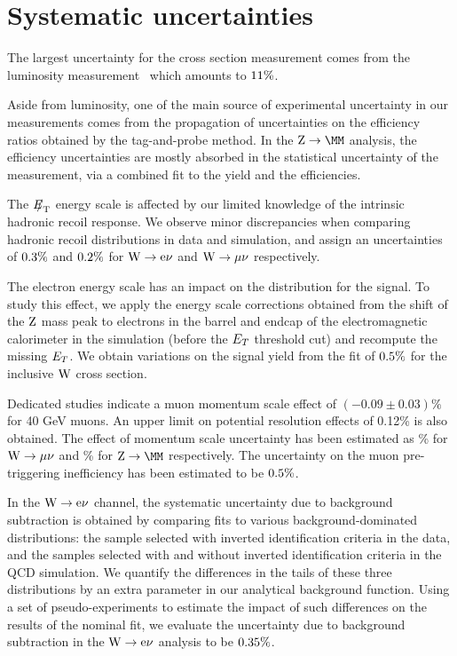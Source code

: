 \section{Systematic uncertainties \label{sec:systematics}}

\par
The largest uncertainty for the cross section measurement comes from
the luminosity measurement~\cite{lumiPAS} which amounts to $ 11  \%$.
\par
Aside from luminosity, one of the main source of experimental uncertainty in our measurements comes from the 
propagation of uncertainties on the efficiency ratios obtained by the tag-and-probe method. 
In the $\Zmm$ analysis, the efficiency uncertainties are mostly
absorbed in the statistical uncertainty of the measurement, via a combined
fit to the yield and the efficiencies.


The ${E\!\!\!/}_{\mathrm{T}}$ energy scale is affected by our limited knowledge of the intrinsic hadronic recoil response. 
We observe minor discrepancies when comparing hadronic recoil distributions in data and simulation, 
and assign an uncertainties of $ 0.3  \%$ and $ 0.2 \%$ for $\mathrm{W} \rightarrow \mathrm{e}\nu$ and $\mathrm{W} \rightarrow \mu\nu$ respectively.
\par
The electron energy scale has an impact on the \ET distribution
for the signal. To study this effect, we apply  the
energy scale corrections obtained
from the shift of the $\mathrm{Z}$ mass peak to electrons in the barrel and endcap of the electromagnetic calorimeter
in the simulation (before the $E_{T}$ threshold cut)
and recompute the missing $E_{T}$. We obtain variations on the signal yield from the fit
of $ 0.5  \%$ for the inclusive $\mathrm{W}$ cross section.  
\par
Dedicated studies indicate a muon momentum scale effect of $(-0.09\pm 0.03)\%$ for 40 GeV muons.
An upper limit on potential resolution effects of 0.12\% is also obtained.
The effect of momentum scale uncertainty has been estimated as \WMISCALESYST\% for $\mathrm{W} \rightarrow \mu\nu$ and
 \ZMMSCALESYST\% for $\Zmm$ respectively.
The uncertainty on the muon pre-triggering inefficiency has been estimated to be
$ 0.5 \%$.


\par
In the $\mathrm{W} \rightarrow \mathrm{e}\nu$ channel, the systematic uncertainty
due to background subtraction is obtained by comparing
fits to various background-dominated distributions:
the sample selected with inverted identification criteria
in the data, and the
samples selected
with and without inverted identification criteria in the QCD simulation.
We quantify
the differences in the tails of these three distributions
by an extra parameter in our analytical background function.
Using a set of pseudo-experiments to estimate
the impact of such differences on the results of the nominal fit, we
evaluate the uncertainty due to background subtraction in the $\mathrm{W} \rightarrow \mathrm{e}\nu$
analysis to be $ 0.35  \%$. 

